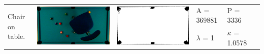 \begin{tabular}{|l|c|c|l|l|c|}
\multirow{2}{*}{Chair on table.} & \multirow{2}{*}{\includegraphics[scale=0.05]{../images/1/5_img.png}} & \multirow{2}{*}{\includegraphics[scale=0.05]{../images/1/5_mask.png}} & A = 369881 & P = 3336 & \multirow{2}{*}{}\\  
& & & $\lambda$ = 1 & $\kappa$ = 1.0578 & \\
\hline


\end{tabular}
